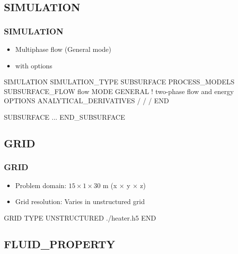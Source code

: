 \documentclass{beamer}
\begin{document}
\subsection{SIMULATION}

\begin{frame}[fragile]\frametitle{SIMULATION}

\begin{itemize}
  \item Multiphase flow (General mode)
  \item with options
\end{itemize}

\begin{semiverbatim}\small
SIMULATION
  SIMULATION_TYPE SUBSURFACE
  PROCESS_MODELS
    SUBSURFACE_FLOW flow
      MODE GENERAL ! two-phase flow and energy
      OPTIONS
        ANALYTICAL_DERIVATIVES
      /   
    /   
  /
END

SUBSURFACE
...
END_SUBSURFACE
\end{semiverbatim}

\end{frame}

\subsection{GRID}

\begin{frame}[fragile]\frametitle{GRID}

\begin{itemize}
  \item Problem domain: $15 \times 1 \times 30$ m (x $\times$ y $\times$ z)
  \item Grid resolution: Varies in unstructured grid
\end{itemize}

\begin{semiverbatim}
GRID
  TYPE UNSTRUCTURED ./heater.h5
END
\end{semiverbatim}

\end{frame}

\subsection{FLUID\_PROPERTY}
\end{document}
